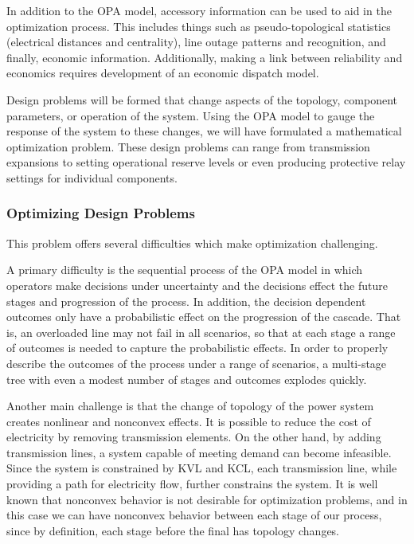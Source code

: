 In addition to the OPA model, accessory information can be used to aid in the optimization process.  This includes things such as pseudo-topological statistics (electrical distances and centrality), line outage patterns and recognition, and finally, economic information.  Additionally, making a link between reliability and economics requires development of an economic dispatch model.

Design problems will be formed that change aspects of the topology, component parameters, or operation of the system.  Using the OPA model to gauge the response of the system to these changes, we will have formulated a mathematical optimization problem.  These design problems can range from transmission expansions to setting operational reserve levels or even producing protective relay settings for individual components.

\subsubsection{Optimizing Design Problems}
This problem offers several difficulties which make optimization challenging.  

A primary difficulty is the sequential process of the OPA model in which operators make decisions under uncertainty and the decisions effect the future stages and progression of the process.  In addition, the decision dependent outcomes only have a probabilistic effect on the progression of the cascade.  That is, an overloaded line may not fail in all scenarios, so that at each stage a range of outcomes is needed to capture the probabilistic effects.  In order to properly describe the outcomes of the process under a range of scenarios, a multi-stage tree with even a modest number of stages and outcomes explodes quickly.

Another main challenge is that the change of topology of the power system creates nonlinear and nonconvex effects.  It is possible to reduce the cost of electricity by removing transmission elements.  On the other hand, by adding transmission lines, a system capable of meeting demand can become infeasible.  Since the system is constrained by KVL and KCL, each transmission line, while providing a path for electricity flow, further constrains the system.  It is well known that nonconvex behavior is not desirable for optimization problems, and in this case we can have nonconvex behavior between each stage of our process, since by definition, each stage before the final has topology changes.

